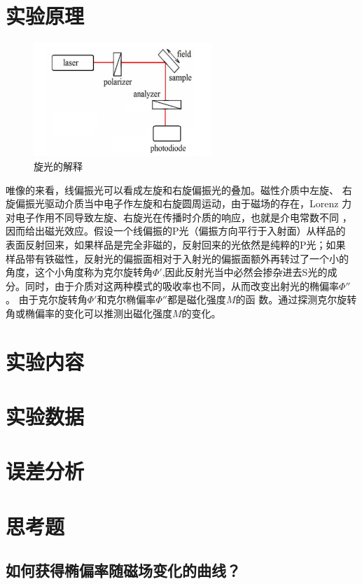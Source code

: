 \documentclass[a4paper]{article}
\begin{document}
\section{实验原理}
\begin{figure}[!h]
    \centering
    \includegraphics[width=0.6\textwidth]{fig/fig1.png}
    \caption{旋光的解释}\label{fig1}
\end{figure}
唯像的来看，线偏振光可以看成左旋和右旋偏振光的叠加。磁性介质中左旋、
右旋偏振光驱动介质当中电子作左旋和右旋圆周运动，由于磁场的存在，Lorenz
力对电子作用不同导致左旋、右旋光在传播时介质的响应，也就是介电常数不同 ，
因而给出磁光效应。假设一个线偏振的P光（偏振方向平行于入射面）从样品的
表面反射回来，如果样品是完全非磁的，反射回来的光依然是纯粹的P光；如果
样品带有铁磁性，反射光的偏振面相对于入射光的偏振面额外再转过了一个小的
角度，这个小角度称为克尔旋转角$\varPhi '$,因此反射光当中必然会掺杂进去S光的成
分。同时，由于介质对这两种模式的吸收率也不同，从而改变出射光的椭偏率$\varPhi ''$。
由于克尔旋转角$\varPhi '$和克尔椭偏率$\varPhi ''$都是磁化强度$M$的函
数。通过探测克尔旋转角或椭偏率的变化可以推测出磁化强度$M$的变化。

\section{实验内容}

\section{实验数据}

\section{误差分析}


\section{思考题}
\subsection*{如何获得椭偏率随磁场变化的曲线？}


\nocite{jiaocai}

\end{document}

